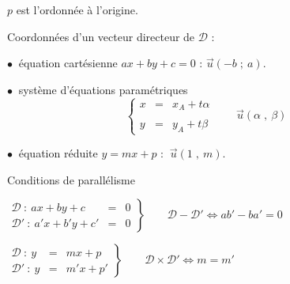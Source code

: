 \documentclass{article}
\begin{document}
		$p$ est l'ordonnée à l'origine.
		
		Coordonnées d'un vecteur directeur de $\mathcal{D}$ :
		
		$\bullet\ $ équation cartésienne $ax+by+c=0$ : $\overrightarrow{u}(-b\;;\ a).$
		
		$\bullet\ $ système d'équations paramétriques $$\left\lbrace\begin{array}{lcl} x& = & x_{A}+t\alpha\\ \\ y& =& y_{A}+t\beta \end{array}\qquad \vec{u}(\alpha\;,\ \beta)\right.$$
		
		$\bullet\ $ équation réduite $y=mx+p$ : $\ \vec{u}(1\;,\ m).$
		
		Conditions de parallélisme
		
		$\left.\begin{array}{lcl} \mathcal{D}\ :\ ax+by+c& = &0\\ \mathcal{D'}\ :\ a'x+b'y+c'& = &0 \end{array}\right\rbrace\qquad\mathcal{D}-\mathcal{D'}\Leftrightarrow ab'-ba'=0$
		
		$\left.\begin{array}{lcl} \mathcal{D}\ :\ y& =& mx+p\\ \mathcal{D'}\ :\ y& =& m'x+p' \end{array}\right\rbrace\qquad\mathcal{D}\times\mathcal{D'}\Leftrightarrow m=m'$
		
\end{document}
